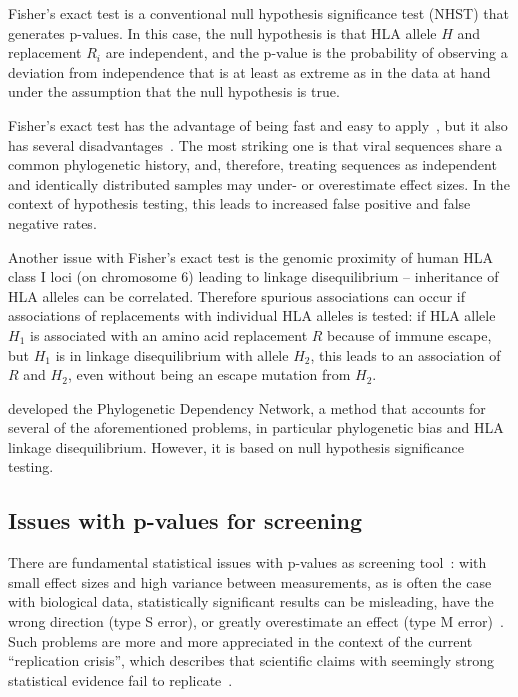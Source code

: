 \documentclass{bioinfo}
\begin{document}
Fisher's exact test is a conventional null hypothesis significance test (NHST) that generates p-values. In this case, the null hypothesis is that HLA allele \(H\) and  replacement \(R_{i}\) are independent, and the p-value is the probability of observing a deviation from independence that is at least as extreme as in the data at hand under the assumption that the null hypothesis is true.

Fisher's exact test has the advantage of being fast and easy to apply~\citep{Budeus2016}, but it also has several disadvantages~\citep{Carlson2008}. The most striking one is that viral sequences share a common phylogenetic history, and,  therefore, treating sequences as independent and identically distributed samples may under- or overestimate effect sizes. In the context of hypothesis testing, this leads to increased false positive and false negative rates. 

Another issue with Fisher's exact test is the genomic proximity of human HLA class I loci (on chromosome 6) leading to linkage disequilibrium -- inheritance of HLA alleles can be correlated. Therefore spurious associations can occur if associations of replacements with individual HLA alleles is tested: if HLA allele \(H_1\) is associated with an amino acid replacement \(R\) because of immune escape, but \(H_1\) is in linkage disequilibrium with allele \(H_2\), this leads to an association of \(R\) and \(H_2\), even without being an escape mutation from $H_2$.

\citet{Carlson2008} developed the Phylogenetic Dependency Network, a method that accounts for several of the aforementioned problems, in particular phylogenetic bias and  HLA linkage disequilibrium. However, it is based on null hypothesis significance testing.

\subsection{Issues with p-values for screening}

There are fundamental statistical issues with p-values as screening tool~\citep{Amrhein2017}:
with small effect sizes and high variance between measurements, as is often the case with biological data, statistically significant results can be misleading, have the wrong direction (type S error), or greatly overestimate an effect (type M error)~\citep{Gelman2014}. Such problems are more and more appreciated in the context of the current ``replication crisis'', which describes that scientific claims with seemingly strong statistical evidence fail to replicate~\citep{Ioannidis2005, Begley:2012, Baker2016Nature-reproducibility-crisis}.
\end{document}
